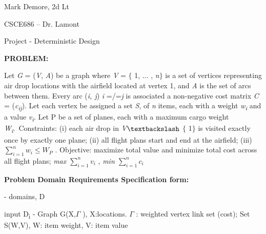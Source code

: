 \documentclass[12pt]{article}
\renewcommand{\_}{\kern-1.5pt\textunderscore\kern-1.5pt}
\begin{document}
\vspace{\baselineskip}
Mark Demore, 2d Lt\par

CSCE686 – Dr. Lamont\par

Project - Deterministic Design\par

\textbf{PROBLEM:}\par

Let \textit{G} = (\textit{V}, \textit{A}) be a graph where \textit{V} = $ \{ $ 1, $ \ldots $ , \textit{n}$ \} $  is a set of vertices representing air drop locations with the airfield located at vertex 1, and \textit{A} is the set of arcs between them. Every arc (\textit{i, j}) \textit{i} =/=\textit{j} is associated a non-negative cost matrix \textit{C} = (\textit{c\textsubscript{ij}}). Let each vertex be assigned a set \textit{S},\textit{ }of \textit{n} items, each with a weight \textit{w\textsubscript{i}} and a value \textit{v\textsubscript{i}}. Let P be a set of planes, each with a maximum cargo weight \textit{W\textsubscript{i}}.\ Constraints:  (i) each air drop in \textit{V}$\textbackslash$ $ \{ $ 1$ \} $  is visited exactly once by exactly one plane; (ii) all flight plans start and end at the airfield; (iii)  \(  \sum _{i=1}^{n}w_{i}  \leq W_{P} \) . Objective: maximize total value and minimize total cost across all flight plans; \textit{max  \(  \sum _{i=1}^{n}v_{i} \) }, \textit{min  \(  \sum _{i=1}^{n}c_{i} \) }\par

\setlength{\parskip}{18.12pt}
\begin{adjustwidth}{0.0in}{-0.36in}
\textbf{Problem Domain Requirements Specification form:}\par

\end{adjustwidth}

\setlength{\parskip}{8.04pt}
\begin{adjustwidth}{0.64in}{0.0in}
- domains, D \par

\end{adjustwidth}

\begin{adjustwidth}{0.64in}{0.0in}
\tab input D\textsubscript{i }- Graph G(X,$ \Gamma $ ), X:locations. $ \Gamma $ : weighted vertex link set (cost); Set S(W,V), W: item weight, V: item value\par

\end{adjustwidth}
\end{document}
